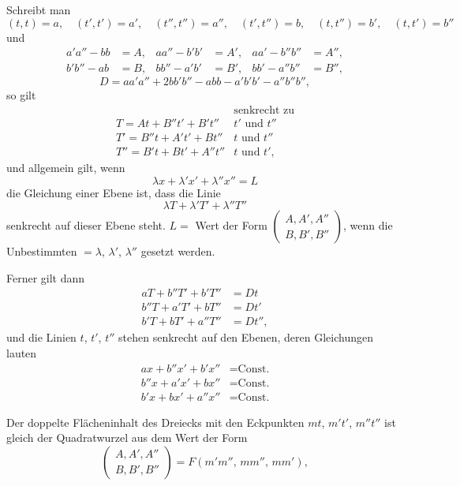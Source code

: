 
Schreibt man
{\small\[
(t,t) = a,\quad (t',t') = a',\quad (t'',t'') = a'',\quad (t',t'') = b,\quad (t,t'') = b',\quad (t,t') = b''
\]}
und
\[\begin{aligned}
a'a'' - bb &= A, & aa'' - b'b' &= A', & aa' - b''b'' &= A'', \\
b'b'' - ab &= B, & bb'' - a'b' &= B', & bb' - a''b'' &= B'',
\end{aligned}\]
\[
D = aa'a'' + 2bb'b'' - abb - a'b'b' - a''b''b'',
\]
so gilt
\[
\begin{array}{ll}
 & \text{senkrecht zu}\\
 T=At+B''t'+B't'' & t'\text{ und }t''\\
 T'=B''t+A't'+Bt'' & t\text{ und }t''\\
 T''=B't+Bt'+A''t'' & t\text{ und }t',
\end{array}
\]
und allgemein gilt, wenn
\[
\lambda x + \lambda' x' + \lambda'' x'' = L
\]
die Gleichung einer Ebene ist, dass die Linie
\[
\lambda T + \lambda' T' + \lambda'' T''
\]
senkrecht auf dieser Ebene steht. $L =$ Wert der Form $\begin{pmatrix} A, A', A'' \\ B, B', B'' \end{pmatrix}$,
wenn die Unbestimmten $= \lambda$, $\lambda'$, $\lambda''$ gesetzt werden.

Ferner gilt dann
\[\begin{aligned}
aT + b''T' + b'T'' &= Dt \\
b''T + a'T' + bT'' &= Dt' \\
b'T + bT' + a''T'' &= Dt'',
\end{aligned}\]
und die Linien $t$, $t'$, $t''$ stehen senkrecht auf den Ebenen, deren Gleichungen lauten
\[\begin{aligned}
ax + b''x' + b'x'' &= \text{Const.} \\
b''x + a'x' + bx'' &= \text{Const.} \\
b'x + bx' + a''x'' &= \text{Const.}
\end{aligned}\]

Der doppelte Flächeninhalt des Dreiecks mit den Eckpunkten $mt$, $m't'$, $m''t''$ ist gleich
der Quadratwurzel aus dem Wert der Form
\[
\begin{pmatrix} A, A', A'' \\ B, B', B'' \end{pmatrix} = F(m'm'',\, mm'',\, mm'),
\]
